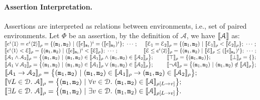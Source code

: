 \documentclass[a4paper,11pt]{article}
\begin{document}
\paragraph{Assertion Interpretation.} Assertions are interpreted as relations between environments, i.e., set of paired environments. Let $\Phi$ be an assertion,
%
by the definition of $\mathcal{A}$, we have $\llbracket \mathcal{A} \rrbracket$ as:
\\
$\sem{\expr^i\langle 1 \rangle 
= \expr^i\langle 2 \rangle}_{\lmem} = 
\{(\trsmem_1, \trsmem_2) 
~|~ (\sem{\expr}_{\trsmem_{1}})^i 
= (\sem{\expr}_{\trsmem_2})^i \};
~ \cdots; 
%
~~~~
%
\sem{\mathcal{E}_1
= \mathcal{E}_2}_{\lmem} = 
\{(\trsmem_1, \trsmem_2) ~|~ \sem{\mathcal{E}_1}_{\lmem} 
< \sem{\mathcal{E}_2}_{\lmem} \};
~\cdots;
%
$
\\
$
%
\sem{\expr^i\langle 1 \rangle 
< \mathcal{E}}_{\lmem} = 
\{(\trsmem_1, \trsmem_2) ~|~ (\sem{\expr}_{\trsmem_{1}})^i 
< \sem{\mathcal{E}}_{\lmem} \};
~\cdots;
%
~~~~~~~~~~~~~~
\sem{\mathcal{E} 
\leq \expr^i\langle 2 \rangle}_{\lmem} = 
\{(\trsmem_1, \trsmem_2) ~|~ \sem{\mathcal{E}}_{\lmem}
\leq (\sem{\expr}_{\trsmem_2})^i \};
%
~\cdots;$
%
\\
$
\llbracket \mathcal{A}_1 \land \mathcal{A}_2 \rrbracket_{\mathtt{\rho}} = \big\{(\mathtt{m}_1, \mathtt{m}_2)
~|~ (\mathtt{m}_1, \mathtt{m}_2) \in \llbracket \mathcal{A}_1 \rrbracket_{\mathtt{\rho}} \land 
	(\mathtt{m}_1, \mathtt{m}_2) \in \llbracket \mathcal{A}_2 \rrbracket_{\mathtt{\rho}} \big\};
~~~~~~~
\llbracket \top \rrbracket_{\mathtt{\rho}} = \{(\mathtt{m}_1, \mathtt{m}_2)\};
~~~~~~~~~~
\llbracket \bot \rrbracket_{\mathtt{\rho}}  = \{\};
$
%
\\
$\llbracket \mathcal{A}_1 \lor \mathcal{A}_2 \rrbracket_{\mathtt{\rho}} = \big\{(\mathtt{m}_1, \mathtt{m}_2)
~|~ (\mathtt{m}_1, \mathtt{m}_2) \in \llbracket \mathcal{A}_1 \rrbracket_{\mathtt{\rho}} \lor 
	(\mathtt{m}_1, \mathtt{m}_2) \in \llbracket \mathcal{A}_2 \rrbracket_{\mathtt{\rho}} \big\};
	~~~~~~~
\llbracket \neg \mathcal{A} \rrbracket_{\mathtt{\rho}} = \big\{(\mathtt{m}_1, \mathtt{m}_2)
~|~ (\mathtt{m}_1, \mathtt{m}_2) \notin \llbracket \mathcal{A} \rrbracket_{\mathtt{\rho}} \big\};$
%
\\
$\llbracket \mathcal{A}_1 \rightarrow \mathcal{A}_2 \rrbracket_{\mathtt{\rho}} = \big\{(\mathtt{m}_1, \mathtt{m}_2)
~|~ (\mathtt{m}_1, \mathtt{m}_2) \in \llbracket \mathcal{A}_1 \rrbracket_{\mathtt{\rho}} \rightarrow 
	(\mathtt{m}_1, \mathtt{m}_2) \in \llbracket \mathcal{A}_2 \rrbracket_{\mathtt{\rho}} \big\};$
%
\\
$\llbracket \forall L \in \mathcal{D}. ~\mathcal{A} \rrbracket_{\mathtt{\rho}} = \big\{(\mathtt{m}_1, \mathtt{m}_2)
~|~ \forall v \in \mathcal{D}. ~ (\mathtt{m}_1, \mathtt{m}_2) \in \llbracket \mathcal{A} \rrbracket_{\mathtt{\rho}[L \to v]} \big\};$
%
\\
$\llbracket \exists L \in \mathcal{D}. ~\mathcal{A} \rrbracket_{\mathtt{\rho}} = \big\{(\mathtt{m}_1, \mathtt{m}_2)
~|~ \exists v \in \mathcal{D}. ~ (\mathtt{m}_1, \mathtt{m}_2) \in \llbracket \mathcal{A} \rrbracket_{\mathtt{\rho}[L \to v]} \big\}.$
%
%
%
\end{document}
